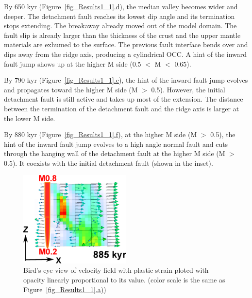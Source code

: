 By 650 kyr (Figure~\hyperref[fig_Results1_1]{\ref{fig_Results1_1}.d}), the median valley becomes wider and deeper. The detachment fault reaches its lowest dip angle and its termination stops extending. The breakaway already moved out of the model domain.
The fault slip is already larger than the thickness of the crust and the upper mantle materials are exhumed to the surface. The previous fault interface bends over and dips away from the ridge axis, producing a cylindrical OCC. A hint of the inward fault jump shows up at the higher M side (0.5 $<$ M $<$ 0.65).

By 790 kyr (Figure~\hyperref[fig_Results1_1]{\ref{fig_Results1_1}.e}), the hint of the inward fault jump evolves and propagates toward the higher M side (M $>$ 0.5). However, the initial detachment fault is still active and takes up most of the extension. The distance between the termination of the detachment fault and the ridge axis is larger at the lower M side.%

By 880 kyr (Figure~\hyperref[fig_Results1_1]{\ref{fig_Results1_1}.f}), at the higher M side (M $>$ 0.5), the hint of the inward fault jump evolves to a high angle normal fault and cuts through the hanging wall of the detachment fault at the higher M side (M $>$ 0.5). It coexists with the initial detachment fault (shown in the inset). 

\begin{figure}[h]
  \centering
    \includegraphics[width=0.5\textwidth]{./Figures/fig_Results_1_velocity_field.eps}
  \caption{Bird's-eye view of velocity field with plastic strain ploted with opacity linearly proportional to its value. (color scale is the same as Figure~\hyperref[fig_Results1_1]{\ref{fig_Results1_1}.a)})}
 \label{fig_Results_1_velocity_field}
\end{figure}

